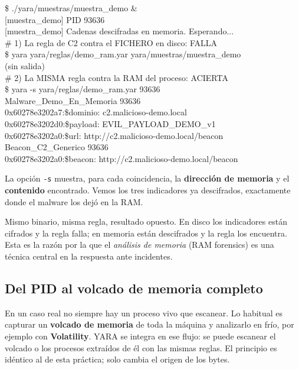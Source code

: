 \documentclass[11pt,a4paper]{article}
\begin{document}
\begin{terminal}
\$ ./yara/muestras/muestra\_demo \&\\
{[}muestra\_demo{]} PID 93636\\
{[}muestra\_demo{]} Cadenas descifradas en memoria. Esperando...\\[6pt]
\# 1) La regla de C2 contra el FICHERO en disco: FALLA\\
\$ yara yara/reglas/demo\_ram.yar yara/muestras/muestra\_demo\\
(sin salida)\\[6pt]
\# 2) La MISMA regla contra la RAM del proceso: ACIERTA\\
\$ yara -s yara/reglas/demo\_ram.yar 93636\\
Malware\_Demo\_En\_Memoria 93636\\
0x60278e3202a7:\$dominio: c2.malicioso-demo.local\\
0x60278e3202d0:\$payload: EVIL\_PAYLOAD\_DEMO\_v1\\
0x60278e3202a0:\$url: http://c2.malicioso-demo.local/beacon\\
Beacon\_C2\_Generico 93636\\
0x60278e3202a0:\$beacon: http://c2.malicioso-demo.local/beacon
\end{terminal}

La opción \texttt{-s} muestra, para cada coincidencia, la \textbf{dirección de
memoria} y el \textbf{contenido} encontrado. Vemos los tres indicadores ya
descifrados, exactamente donde el malware los dejó en la RAM.

\begin{ideaclave}
Mismo binario, misma regla, resultado opuesto. En disco los indicadores están
cifrados y la regla falla; en memoria están descifrados y la regla los encuentra.
Esta es la razón por la que el \emph{análisis de memoria} (RAM forensics) es una
técnica central en la respuesta ante incidentes.
\end{ideaclave}

\subsection*{Del PID al volcado de memoria completo}

En un caso real no siempre hay un proceso vivo que escanear. Lo habitual es
capturar un \textbf{volcado de memoria} de toda la máquina y analizarlo en frío,
por ejemplo con \textbf{Volatility}. YARA se integra en ese flujo: se puede
escanear el volcado o los procesos extraídos de él con las mismas reglas. El
principio es idéntico al de esta práctica; solo cambia el origen de los bytes.
\end{document}
